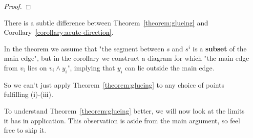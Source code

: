 
\begin{proof}
\end{proof}

\begin{remark}\label{remark:pitfall}
  There is a subtle difference between Theorem~\ref{theorem:glueing} and Corollary~\ref{corollary:acute-direction}.

  In the theorem we assume that "the segment between $s$ and $s^i$ is a \textbf{subset} of the main edge", but in the corollary we construct a diagram for which "the main edge from $v_i$ lies on $v_i \wedge y_i$", implying that $y_i$ can lie outside the main edge. 

  So we can't just apply Theorem~\ref{theorem:glueing} to any choice of points fulfilling (i)-(iii).
\end{remark}

To understand Theorem~\ref{theorem:glueing} better, we will now look at the limits it has in application. This observation is aside from the main argument, so feel free to skip it.


